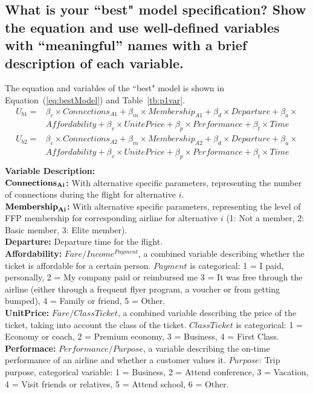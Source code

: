\documentclass[11pt]{article}
\begin{document}
\subsection{\small{What is your ``best" model specification? Show the equation and use well-defined variables with “meaningful” names with a brief description of each variable.}}
The equation and variables of the ``best" model is shown in Equation~(\ref{eq:bestModel}) and Table~\ref{tb:p1var}.
\begin{equation}\label{eq:bestModel}
\begin{array}{ll}
U_{b1}=&\beta_c\times Connections_{A1}+\beta_m\times Membership_{A1}+\beta_d\times Departure+\beta_a\times\\& Affordability+\beta_v\times UnitePrice+\beta_p\times Performance+\beta_t\times Time\\
U_{b2}=&\beta_c\times Connections_{A2}+\beta_m\times Membership_{A2}+\beta_d\times Departure+\beta_a\times\\& Affordability+\beta_v\times UnitePrice+\beta_p\times Performance+\beta_t\times Time\\
\end{array}
\end{equation}
\textbf{Variable Description:}\\
$\bf{\textbf{Connections}_{Ai}}$\textbf{:} With alternative specific parameters, representing the number of connections during the flight for alternative $i$.\\
$\bf{\textbf{Membership}_{Ai}}$\textbf{:} With alternative specific parameters, representing the level of FFP membership for corresponding airline for alternative $i$ (1: Not a member, 2: Basic member, 3: Elite member).\\
\textbf{Departure:} Departure time for the flight.\\
\textbf{Affordability:} $Fare/Income^{Payment}$, a combined variable describing whether the ticket is affordable for a certain person. $Payment$ is categorical: 1 = I paid, personally, 2 = My company paid or reimbursed me 3 = It was free through the airline (either through a frequent flyer program, a voucher or from getting bumped), 4 = Family or friend, 5 = Other.\\
\textbf{UnitPrice:} $Fare/ClassTicket$, a combined variable describing the price of the ticket, taking into account the class of the ticket. $ClassTicket$ is categorical: 1 = Economy or coach, 2 = Premium economy, 3 = Business, 4 = First Class.\\
\textbf{Performace:} $Performance/Purpose$, a variable describing the on-time performance of an airline and whether a customer values it. $Purpose$: Trip purpose, categorical variable: 1 = Business, 2 = Attend conference, 3 = Vacation, 4 = Visit friends or relatives, 5 = Attend school, 6 = Other.\\
\end{document}
